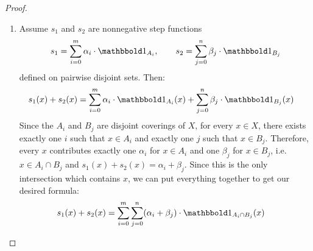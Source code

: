 \begin{proof}
	\begin{enumerate}
		\item Assume $s_1$ and $s_2$ are nonnegative step functions
		\begin{align*}
			s_1 = \sum_{i = 0}^m \alpha_i \cdot \boldone_{A_i}, \qquad
			s_2 = \sum_{j = 0}^n \beta_j \cdot \boldone_{B_j}
		\end{align*}
		defined on pairwise disjoint sets.
		\newpar
		Then:
		\begin{align*}
			s_1(x) + s_2(x)
			&=
			\sum_{i = 0}^m \alpha_i \cdot \boldone_{A_i}(x)
			+
			\sum_{j = 0}^n \beta_j \cdot \boldone_{B_j}(x)
		\end{align*}
		Since the $A_i$ and $B_j$ are disjoint coverings of $X$, for every $x \in X$, there exists exactly one $i$ such that $x \in A_i$ and exactly one $j$ such that $x \in B_j$. Therefore, every $x$ contributes exactly one $\alpha_i$ for $x \in A_i$ and one $\beta_j$ for $x \in B_j$, i.e. $x \in A_i \cap B_j$ and $s_1(x) + s_2(x) = \alpha_i + \beta_j$. Since this is the only intersection which contains $x$, we can put everything together to get our desired formula:
		\begin{align*}
			s_1(x) + s_2(x)
			&=
			\sum_{i = 0}^m \sum_{j = 0}^n (\alpha_i + \beta_j) \cdot \boldone_{A_i \cap B_j}(x)
		\end{align*}
	\end{enumerate}
\end{proof}

